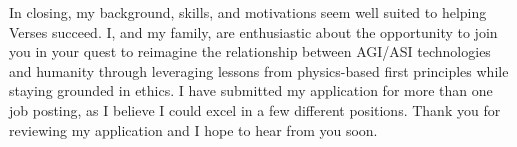 \begin{cvletter}
In closing, my background, skills, and motivations seem well suited to helping Verses succeed. I,
and my family, are enthusiastic about the opportunity to join you in your quest to reimagine the
relationship between AGI/ASI technologies and humanity through leveraging lessons from physics-based
first principles while staying grounded in ethics. I have submitted my application for more than one
job posting, as I believe I could excel in a few different positions. Thank you for reviewing my
application and I hope to hear from you soon.


\end{cvletter}

